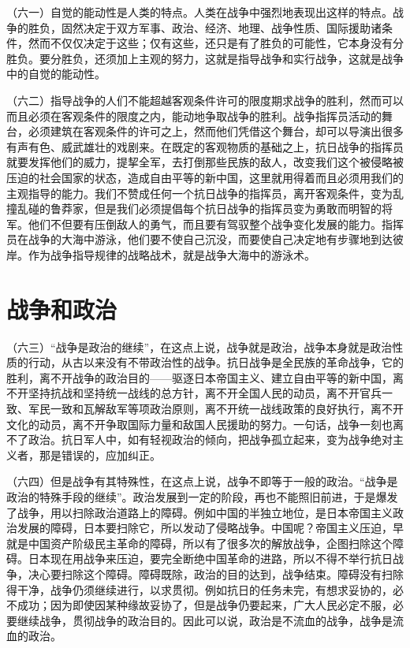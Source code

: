 （六一）自觉的能动性是人类的特点。人类在战争中强烈地表现出这样的特点。战争的胜负，固然决定于双方军事、政治、经济、地理、战争性质、国际援助诸条件，然而不仅仅决定于这些；仅有这些，还只是有了胜负的可能性，它本身没有分胜负。要分胜负，还须加上主观的努力，这就是指导战争和实行战争，这就是战争中的自觉的能动性。

（六二）指导战争的人们不能超越客观条件许可的限度期求战争的胜利，然而可以而且必须在客观条件的限度之内，能动地争取战争的胜利。战争指挥员活动的舞台，必须建筑在客观条件的许可之上，然而他们凭借这个舞台，却可以导演出很多有声有色、威武雄壮的戏剧来。在既定的客观物质的基础之上，抗日战争的指挥员就要发挥他们的威力，提挈全军，去打倒那些民族的敌人，改变我们这个被侵略被压迫的社会国家的状态，造成自由平等的新中国，这里就用得着而且必须用我们的主观指导的能力。我们不赞成任何一个抗日战争的指挥员，离开客观条件，变为乱撞乱碰的鲁莽家，但是我们必须提倡每个抗日战争的指挥员变为勇敢而明智的将军。他们不但要有压倒敌人的勇气，而且要有驾驭整个战争变化发展的能力。指挥员在战争的大海中游泳，他们要不使自己沉没，而要使自己决定地有步骤地到达彼岸。作为战争指导规律的战略战术，就是战争大海中的游泳术。

\section{战争和政治}

（六三）“战争是政治的继续”，在这点上说，战争就是政治，战争本身就是政治性质的行动，从古以来没有不带政治性的战争。抗日战争是全民族的革命战争，它的胜利，离不开战争的政治目的——驱逐日本帝国主义、建立自由平等的新中国，离不开坚持抗战和坚持统一战线的总方针，离不开全国人民的动员，离不开官兵一致、军民一致和瓦解敌军等项政治原则，离不开统一战线政策的良好执行，离不开文化的动员，离不开争取国际力量和敌国人民援助的努力。一句话，战争一刻也离不了政治。抗日军人中，如有轻视政治的倾向，把战争孤立起来，变为战争绝对主义者，那是错误的，应加纠正。

（六四）但是战争有其特殊性，在这点上说，战争不即等于一般的政治。“战争是政治的特殊手段的继续”。政治发展到一定的阶段，再也不能照旧前进，于是爆发了战争，用以扫除政治道路上的障碍。例如中国的半独立地位，是日本帝国主义政治发展的障碍，日本要扫除它，所以发动了侵略战争。中国呢？帝国主义压迫，早就是中国资产阶级民主革命的障碍，所以有了很多次的解放战争，企图扫除这个障碍。日本现在用战争来压迫，要完全断绝中国革命的进路，所以不得不举行抗日战争，决心要扫除这个障碍。障碍既除，政治的目的达到，战争结束。障碍没有扫除得干净，战争仍须继续进行，以求贯彻。例如抗日的任务未完，有想求妥协的，必不成功；因为即使因某种缘故妥协了，但是战争仍要起来，广大人民必定不服，必要继续战争，贯彻战争的政治目的。因此可以说，政治是不流血的战争，战争是流血的政治。

